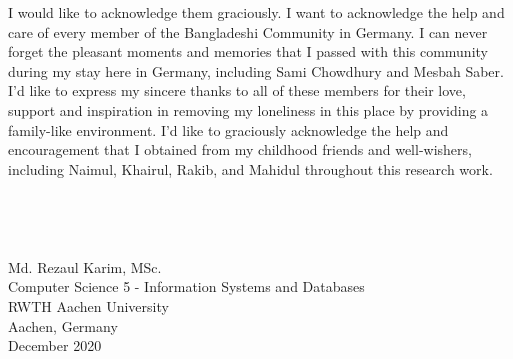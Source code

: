 \begin{acknowledgements}
    \hspace*{5mm} I would like to acknowledge them graciously. I want to acknowledge the help and care of every member of the Bangladeshi Community in Germany. I can never forget the pleasant moments and memories that I passed with this community during my stay here in Germany, including Sami Chowdhury and Mesbah Saber. I'd like to express my sincere thanks to all of these members for their love, support and inspiration in removing my loneliness in this place by providing a family-like environment. I'd like to graciously acknowledge the help and encouragement that I obtained from my childhood friends and well-wishers, including Naimul, Khairul, Rakib, and Mahidul throughout this research work. \\ \\ %
    \\ \\ \\ 
    \flushright Md. Rezaul Karim, MSc. \\
    Computer Science 5 - Information Systems and Databases\\
    RWTH Aachen University\\ 
    Aachen, Germany \\
    December 2020
\end{acknowledgements}